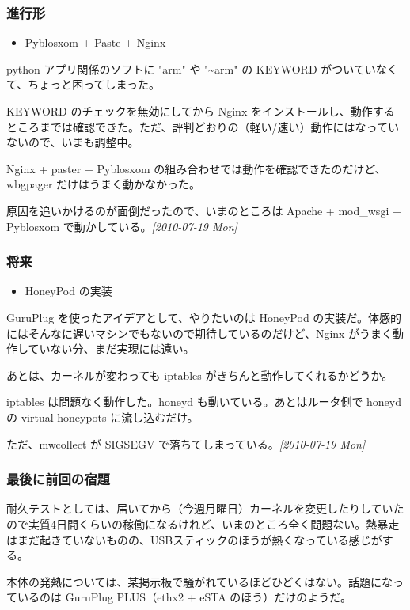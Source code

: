 \documentclass[11pt]{article}
\begin{document}
\subsubsection{進行形}
\label{sec:org8f34b63}
\begin{itemize}
\item Pyblosxom + Paste + Nginx
\end{itemize}

python アプリ関係のソフトに "arm" や "\textasciitilde{}arm" の KEYWORD がついていなくて、ちょっと困ってしまった。

KEYWORD のチェックを無効にしてから Nginx をインストールし、動作するところまでは確認できた。ただ、評判どおりの（軽い/速い）動作にはなっていないので、いまも調整中。

Nginx + paster + Pyblosxom の組み合わせでは動作を確認できたのだけど、wbgpager だけはうまく動かなかった。

原因を追いかけるのが面倒だったので、いまのところは Apache + mod\_wsgi + Pyblosxom で動かしている。\textit{{[}2010-07-19 Mon]}
\subsubsection{将来}
\label{sec:orgcd44a49}
\begin{itemize}
\item HoneyPod の実装
\end{itemize}

GuruPlug を使ったアイデアとして、やりたいのは HoneyPod の実装だ。体感的にはそんなに遅いマシンでもないので期待しているのだけど、Nginx がうまく動作していない分、まだ実現には遠い。

あとは、カーネルが変わっても iptables がきちんと動作してくれるかどうか。

iptables は問題なく動作した。honeyd も動いている。あとはルータ側で honeyd の virtual-honeypots に流し込むだけ。

ただ、mwcollect が SIGSEGV で落ちてしまっている。\textit{{[}2010-07-19 Mon]}
\subsubsection{最後に前回の宿題}
\label{sec:org46e3d68}
耐久テストとしては、届いてから（今週月曜日）カーネルを変更したりしていたので実質4日間くらいの稼働になるけれど、いまのところ全く問題ない。熱暴走はまだ起きていないものの、USBスティックのほうが熱くなっている感じがする。

本体の発熱については、某掲示板で騒がれているほどひどくはない。話題になっているのは GuruPlug PLUS（ethx2 + eSTA のほう）だけのようだ。
\end{document}
